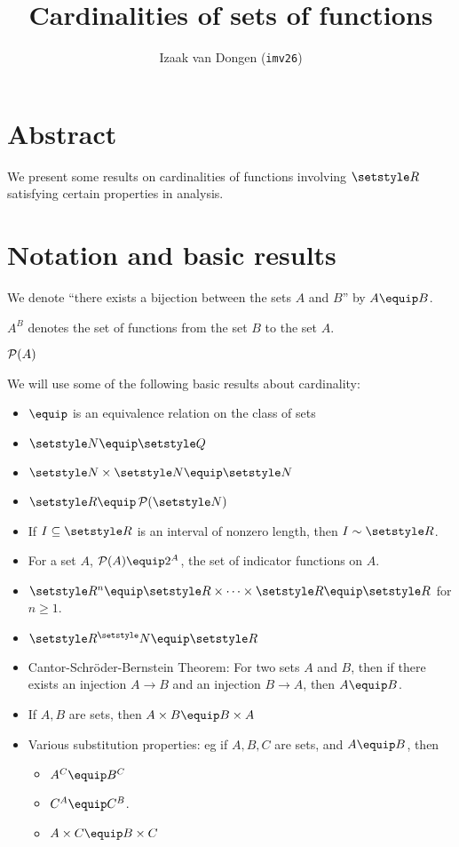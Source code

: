 \documentclass[fleqn,a4paper,11pt]{article}
\title{Cardinalities of sets of functions}
\author{\texorpdfstring{Izaak van Dongen (\texttt{imv26})}
                       {Izaak van Dongen (imv26)}}
\begin{document}
 \section*{Abstract}

 We present some results on cardinalities of functions involving \(\R\)
 satisfying certain properties in analysis.

 \section*{Notation and basic results}

 We denote ``there exists a bijection between the sets \(A\) and \(B\)'' by
 \(A \equip B\).

 \(A^B\) denotes the set of functions from the set \(B\) to the set \(A\).

 \(\operatorname{\mathcal P}(A)\)

 We will use some of the following basic results about cardinality:
 \begin{itemize}
  \item
   \(\equip\) is an equivalence relation on the class of sets
  \item
   \(\N \equip \Q\)
  \item
   \(\N \times \N \equip \N\)
  \item
   \(\R \equip \powerset(\N)\)
  \item
   If \(I \subseteq \R\) is an interval of nonzero length, then
   \(I \sim \R\).
  \item
   For a set \(A\), \(\powerset(A) \equip 2^A\), the set of indicator functions
   on \(A\).
  \item
   \(\R^n \equip \R \times \dotsb \times \R \equip \R\) for \(n \ge 1\).
  \item
   \(\R^\N \equip \R\)
  \item
   Cantor-Schr\"oder-Bernstein Theorem: For two sets \(A\) and \(B\), then
   if there exists an injection \(A \to B\) and an injection \(B \to A\), then
   \(A \equip B\).
  \item
   If \(A, B\) are sets, then \(A \times B \equip B \times A\)
  \item
   Various substitution properties: eg if \(A, B, C\) are sets, and
   \(A \equip B\), then
   \begin{itemize}
    \item
     \(A^C \equip B^C\)
    \item
     \(C^A \equip C^B\).
    \item
     \(A \times C \equip B \times C\)
   \end{itemize}
 \end{itemize}
\end{document}
